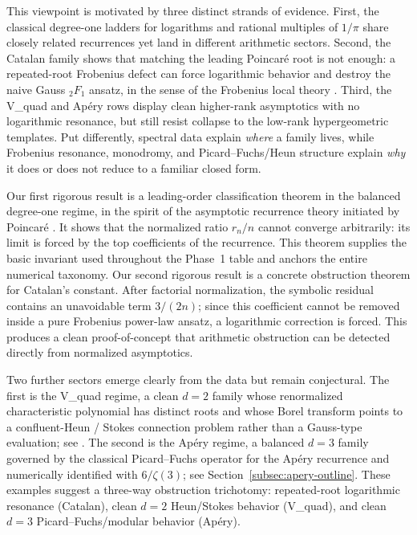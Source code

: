 \documentclass[11pt]{article}
\begin{document}
This viewpoint is motivated by three distinct strands of evidence. First, the classical degree-one ladders for logarithms and rational multiples of $1/\pi$ share closely related recurrences yet land in different arithmetic sectors. Second, the Catalan family shows that matching the leading Poincar\'e root is not enough: a repeated-root Frobenius defect can force logarithmic behavior and destroy the naive Gauss ${}_2F_1$ ansatz, in the sense of the Frobenius local theory \cite{frobenius1873}. Third, the V\_quad and Ap\'ery rows display clean higher-rank asymptotics with no logarithmic resonance, but still resist collapse to the low-rank hypergeometric templates. Put differently, spectral data explain \emph{where} a family lives, while Frobenius resonance, monodromy, and Picard--Fuchs/Heun structure explain \emph{why} it does or does not reduce to a familiar closed form.

Our first rigorous result is a leading-order classification theorem in the balanced degree-one regime, in the spirit of the asymptotic recurrence theory initiated by Poincar\'e \cite{poincare1885}. It shows that the normalized ratio $r_n/n$ cannot converge arbitrarily: its limit is forced by the top coefficients of the recurrence. This theorem supplies the basic invariant used throughout the Phase~1 table and anchors the entire numerical taxonomy. Our second rigorous result is a concrete obstruction theorem for Catalan's constant. After factorial normalization, the symbolic residual contains an unavoidable term $3/(2n)$; since this coefficient cannot be removed inside a pure Frobenius power-law ansatz, a logarithmic correction is forced. This produces a clean proof-of-concept that arithmetic obstruction can be detected directly from normalized asymptotics.

Two further sectors emerge clearly from the data but remain conjectural. The first is the V\_quad regime, a clean $d=2$ family whose renormalized characteristic polynomial has distinct roots and whose Borel transform points to a confluent-Heun / Stokes connection problem rather than a Gauss-type evaluation; see \cite{ronveaux1995}. The second is the Ap\'ery regime, a balanced $d=3$ family governed by the classical Picard--Fuchs operator for the Ap\'ery recurrence and numerically identified with $6/\zeta(3)$; see Section~\ref{subsec:apery-outline}. These examples suggest a three-way obstruction trichotomy: repeated-root logarithmic resonance (Catalan), clean $d=2$ Heun/Stokes behavior (V\_quad), and clean $d=3$ Picard--Fuchs/modular behavior (Ap\'ery).
\end{document}
